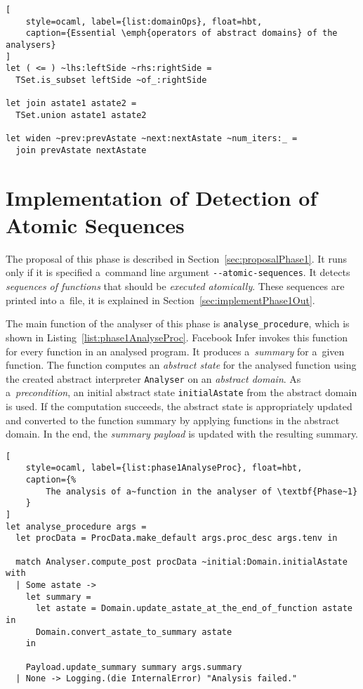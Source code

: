 \begin{lstlisting}[
    style=ocaml, label={list:domainOps}, float=hbt,
    caption={Essential \emph{operators of abstract domains} of the analysers}
]
let ( <= ) ~lhs:leftSide ~rhs:rightSide =
  TSet.is_subset leftSide ~of_:rightSide

let join astate1 astate2 =
  TSet.union astate1 astate2

let widen ~prev:prevAstate ~next:nextAstate ~num_iters:_ =
  join prevAstate nextAstate
\end{lstlisting}


\section{Implementation of Detection of Atomic Sequences}
\label{sec:implementPhase1}

The proposal of this phase is described in Section~\ref{sec:proposalPhase1}.
It runs only if it is specified a~command line argument
\texttt{{-}{-}atomic-sequences}. It detects \emph{sequences of functions}
that should be \emph{executed atomically}. These sequences are printed into
a~file, it is explained in Section~\ref{sec:implementPhase1Out}.

The main function of the analyser of this phase is
\texttt{analyse\_procedure}, which is shown in
Listing~\ref{list:phase1AnalyseProc}. Facebook Infer invokes
this function for every function in an analysed program. It produces
a~\emph{summary} for a~given function. The function computes an
\emph{abstract state} for the analysed function using the created abstract
interpreter \texttt{Analyser} on an \emph{abstract domain}. As
a~\emph{precondition}, an initial abstract state \texttt{initialAstate} from
the abstract domain is used. If the computation succeeds, the abstract
state is appropriately updated and converted to the function summary by
applying functions in the abstract domain. In the end, the \emph{summary
payload} is updated with the resulting summary.

\begin{lstlisting}[
    style=ocaml, label={list:phase1AnalyseProc}, float=hbt,
    caption={%
        The analysis of a~function in the analyser of \textbf{Phase~1}
    }
]
let analyse_procedure args =
  let procData = ProcData.make_default args.proc_desc args.tenv in

  match Analyser.compute_post procData ~initial:Domain.initialAstate with
  | Some astate ->
    let summary =
      let astate = Domain.update_astate_at_the_end_of_function astate in
      Domain.convert_astate_to_summary astate
    in

    Payload.update_summary summary args.summary
  | None -> Logging.(die InternalError) "Analysis failed."
\end{lstlisting}

